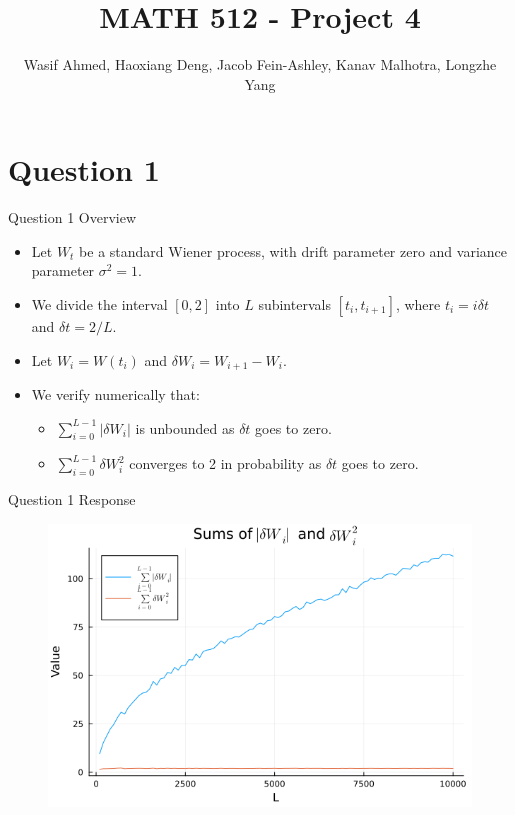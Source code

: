 \documentclass[compress,12pt]{beamer}
\title{MATH 512 - Project 4}
\subtitle{}
\date{}
\author{Wasif Ahmed, Haoxiang Deng, Jacob Fein-Ashley, Kanav Malhotra, Longzhe Yang}
\begin{document}
\frame[plain]{\titlepage}

\section{Question 1}



\begin{frame}{Question 1 Overview}
      \begin{itemize}
            \item Let $W_t$ be a standard Wiener process, with drift parameter zero and variance parameter $\sigma^2 = 1$.
            \item We divide the interval $[0,2]$ into $L$ subintervals $[t_i, t_{i+1}]$, where $t_i = i\delta t$ and $\delta t = 2/L$.
            \item Let $W_i = W(t_i)$ and $\delta W_i = W_{i+1} - W_i$.
            \item We verify numerically that:
            \begin{itemize}
                  \item $\sum_{i=0}^{L-1} |\delta W_i|$ is unbounded as $\delta t$ goes to zero.
                  \item $\sum_{i=0}^{L-1} \delta W_i^2$ converges to 2 in probability as $\delta t$ goes to zero.
            \end{itemize}
      \end{itemize}
      
\end{frame}

\begin{frame}{Question 1 Response}
    \begin{figure}[H]
      \centering
      \includegraphics[scale=0.5]{imgs/convergence1.png}
      \end{figure}
\end{frame}
\end{document}
